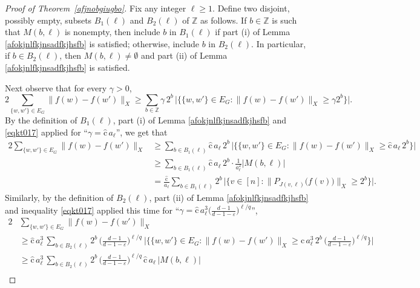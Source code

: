\documentclass[11pt,leqno]{amsart}
\theoremstyle{remark}
\theoremstyle{plain}
\begin{document}
\begin{proof}[Proof of Theorem~\ref{afjnobgiugbo}]
Fix any integer $\ell\geqslant 1$. Define two disjoint, possibly empty, subsets $B_1(\ell)$ and $B_2(\ell)$ of $\mathbb{Z}$
as follows. If $b\in \mathbb{Z}$ is such that $M(b,\ell)$ is nonempty,
then include $b$ in $B_1(\ell)$ if part (i) of Lemma \ref{afokjnlfkjnsadfkjhsfb} is satisfied; otherwise,
include $b$ in $B_2(\ell)$. In particular, if $b\in B_2(\ell)$, then
$M(b,\ell)\neq\emptyset$ and part (ii)
of Lemma \ref{afokjnlfkjnsadfkjhsfb} is satisfied.

Next observe that for every $\gamma>0$,
\begin{equation}\label{eqkt017}
2 \sum_{\{w,w'\}\in E_G}\|f(w)-f(w')\|_X \geqslant
\sum_{b\in\mathbb{Z}}\gamma\, 2^b\, \big|\big\{ \{w,w'\}\in E_G\colon \|f(w)-f(w')\|_X\geqslant \gamma 2^b\big\}\big|.
\end{equation}
By the definition of $B_1(\ell)$, part (i) of Lemma \ref{afokjnlfkjnsadfkjhsfb} and \eqref{eqkt017} applied for
``$\gamma= \hat{\mathrm{c}}\,a_\ell$'', we get that
\begin{align*}
2\sum_{\{w,w'\}\in E_G}\|f(w)-f(w')\|_X &\geqslant \sum\limits_{b\in B_1(\ell)} \hat{\mathrm{c}}\,a_\ell\,2^b\,
\big|\big\{\{w,w'\}\in E_G\colon \|f(w)-f(w')\|_X\geqslant \hat{\mathrm{c}}\,a_\ell\,2^b\big\}\big|\\
&\geqslant \sum\limits_{b\in B_1(\ell)}\hat{\mathrm{c}}\,a_\ell\,2^b\cdot
\frac{1}{a_\ell^2}|M(b,\ell)|\\
&= \frac{\hat{\mathrm{c}}}{a_\ell}\sum\limits_{b\in B_1(\ell)}2^b\,
\big|\big\{v\in[n]\colon \big\|P_{J(v,\ell)}\big(f(v)\big)\big\|_X\geqslant 2^b\big\} \big|.
\end{align*}
Similarly, by the definition of $B_2(\ell)$, part (ii) of Lemma \ref{afokjnlfkjnsadfkjhsfb} and inequality \eqref{eqkt017}
applied this time for ``$\gamma= \hat{\mathrm{c}}\,a_\ell^3 \big(\frac{d-1}{d-1-\varepsilon}\big)^{\ell/q}$'',
\begin{align*}
2&\sum_{\{w,w'\}\in E_G}\|f(w)-f(w')\|_X\\
&\geqslant \hat{\mathrm{c}}\,a_\ell^3\,
\sum\limits_{b\in B_2(\ell)}
2^b\,\bigg(\frac{d-1}{d-1-\varepsilon}\bigg)^{\ell/q}\
\bigg|\Big\{\{w,w'\}\in E_G\colon \|f(w)-f(w')\|_X\geqslant
\hat{\mathrm{c}}\,a_\ell^3\,2^b\,\bigg(\frac{d-1}{d-1-\varepsilon}\bigg)^{\ell/q}
\Big\}\bigg|
\\
&\geqslant\hat{\mathrm{c}}\,a_\ell^3\,
\sum\limits_{b\in B_2(\ell)}
2^b\,\bigg(\frac{d-1}{d-1-\varepsilon}\bigg)^{\ell/q}\,
\hat{\mathrm{c}}\,a_\ell\,|M(b,\ell)|\\

\end{align*}
\end{proof}
\end{document}
